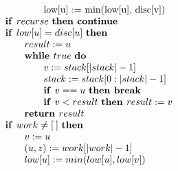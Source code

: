 \documentclass{article}
\newcommand{\emptylist}{\ensuremath{[\:]}}
\newcommand{\Space}{\text{\ }}
\newcommand{\If}{\text{\textbf{if }}}
\newcommand{\Do}{\text{\textbf{do }}}
\newcommand{\Then}{\text{\textbf{then }}}
\newcommand{\While}{\text{\textbf{while }}}
\newcommand{\Break}{\text{\textbf{break }}}
\newcommand{\Continue}{\text{\textbf{continue }}}
\newcommand{\Return}{\text{\textbf{return }}}
\begin{document}
\[\begin{tabular}{l}
\qquad \qquad \qquad low[u] := min(low[u], disc[v]) \\
\qquad $\If recurse$ \Then \Continue \\
\qquad \If $low[u] = disc[u]$ \Then \\
\qquad \qquad $result := u$ \\
\qquad \qquad \While $true$ \Do \\
\qquad \qquad \qquad $v := stack[|stack| - 1]$ \\
\qquad \qquad \qquad $stack := stack[0:|stack| - 1]$ \\
\qquad \qquad \qquad \If $v == u$ \Then \Break \\
\qquad \qquad \qquad $\If v < result \Space \Then result := v$ \\
\qquad \qquad $\Return result$ \\
\qquad $\If work \neq \emptylist \Space \Then$ \\
\qquad \qquad $v := u$ \\
\qquad \qquad $(u, z) := work[|work| - 1]$\\
\qquad \qquad $low[u] := min(low[u], low[v])$ \\
\end{tabular}
\]

\newpage


\end{document}
